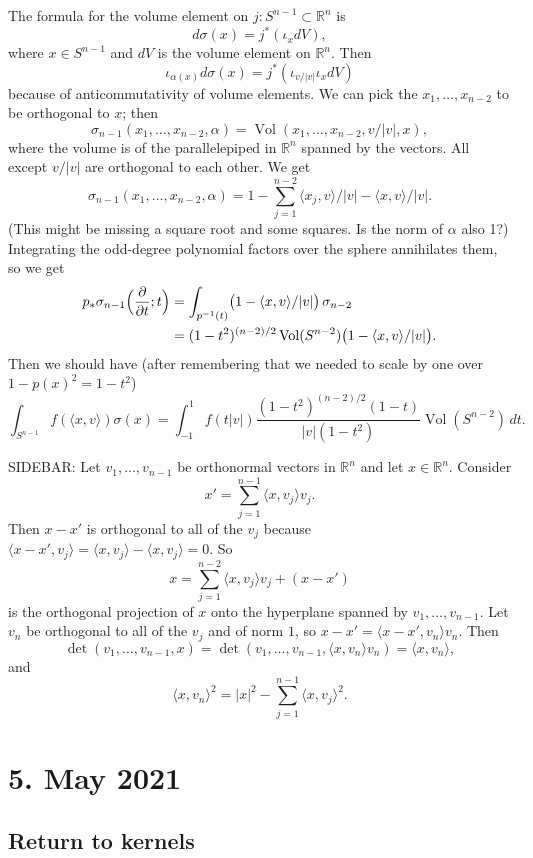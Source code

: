 \documentclass[11pt]{article}
\theoremstyle{definition}
\newcommand{\kk}[1]{\mathbb{#1}}
\DeclareMathOperator{\Vol}{Vol}
\begin{document}
The formula for the volume element on $j : S^{n-1} \subset \kk R^n$ is
\[
d\sigma(x) = j^*(\iota_x dV),
\]
where $x \in S^{n-1}$ and $dV$ is the volume element on $\kk R^n$. Then
\[
\iota_{\alpha(x)} d\sigma(x)
= j^*(\iota_{v/|v|} \iota_x dV)
\]
because of anticommutativity of volume elements. We can pick the $x_1,\ldots,x_{n-2}$ to be orthogonal to $x$; then
\[
\sigma_{n-1}(x_1,\ldots,x_{n-2},\alpha)
= \Vol(x_1,\ldots,x_{n-2},v/|v|,x),
\]
where the volume is of the parallelepiped in $\kk R^n$ spanned by the vectors. All except $v/|v|$ are orthogonal to each other. We get
\[
\sigma_{n-1}(x_1,\ldots,x_{n-2},\alpha)
= 1 - \sum_{j=1}^{n-2} \langle x_j, v \rangle / |v| - \langle x, v \rangle / |v|.
\]
(This might be missing a square root and some squares. Is the norm of $\alpha$ also 1?)
Integrating the odd-degree polynomial factors over the sphere annihilates them, so we get
\begin{align*}
p_* \sigma_{n-1}\Bigl(\frac{\partial}{\partial t}; t \Bigr)
&= \int_{p^{-1}(t)} \bigl(1 - \langle x, v \rangle / |v| \bigr) \, \sigma_{n-2}
\\
  &= (1-t^2)^{(n-2)/2} \Vol(S^{n-2}) \bigl(1 - \langle x, v \rangle / |v| \bigr).
\end{align*}
Then we should have (after remembering that we needed to scale by one over $1-p(x)^2 = 1-t^2$)
\[
\int_{S^{n-1}} f(\langle x, v \rangle) \sigma(x)
= \int_{-1}^1 f(t|v|) \frac{(1-t^2)^{(n-2)/2} (1 - t)}{|v| (1-t^2)} \Vol(S^{n-2}) \, dt.
\]


SIDEBAR: Let $v_1,\ldots,v_{n-1}$ be orthonormal vectors in $\kk R^n$ and let $x \in \kk R^n$. Consider
\[
x' = \sum_{j=1}^{n-1} \langle x, v_j \rangle v_j.
\]
Then $x - x'$ is orthogonal to all of the $v_j$ because $\langle x - x', v_j \rangle = \langle x, v_j \rangle - \langle x, v_j \rangle = 0$. So
\[
x = \sum_{j=1}^{n-2} \langle x, v_j \rangle v_j + (x - x')
\]
is the orthogonal projection of $x$ onto the hyperplane spanned by $v_1,\ldots,v_{n-1}$. Let $v_n$ be orthogonal to all of the $v_j$ and of norm $1$, so $x - x' = \langle x - x', v_n \rangle v_n$. Then
\[
\det(v_1,\ldots,v_{n-1}, x)
= \det(v_1,\ldots,v_{n-1}, \langle x, v_n \rangle v_n)
= \langle x, v_n \rangle,
\]
and
\[
\langle x, v_n \rangle^2
= |x|^2 - \sum_{j=1}^{n-1} \langle x, v_j \rangle^2.
\]




\section*{5. May 2021}
\subsection*{Return to kernels}
\end{document}
